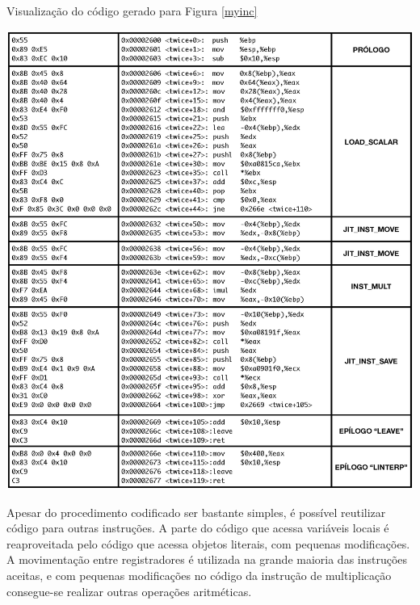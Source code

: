 \begin{table}[ht!]
  \centering
  \caption{Visualização do código gerado para Figura \ref{myinc} \label{codcompleto}}
  \includegraphics[scale=0.68]{figs/codelongo}
\end{table}

Apesar do procedimento codificado ser bastante simples, é possível
reutilizar código para outras instruções.
 A parte do código que acessa
variáveis locais é reaproveitada pelo código que acessa objetos
literais, com pequenas modificações. A movimentação entre
registradores é utilizada na grande maioria das instruções aceitas, e
com pequenas modificações no código da instrução de multiplicação
consegue-se realizar outras operações aritméticas.

